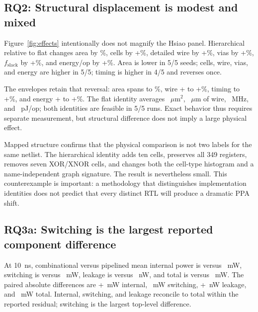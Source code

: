\documentclass[conference,10pt]{IEEEtran}
\begin{document}
\subsection{RQ2: Structural displacement is modest and mixed}

Figure~\ref{fig:effects} intentionally does not magnify the Hsiao panel. Hierarchical relative to flat changes area by \HsAreaMean\%, cells by +\HsCellsMean\%, detailed wire by +\HsWireMean\%, vias by +\HsViasMean\%, $f_{\mathrm{slack}}$ by +\HsFreqMean\%, and energy/op by +\HsEnergyMean\%. Area is lower in 5/5 seeds; cells, wire, vias, and energy are higher in 5/5; timing is higher in 4/5 and reverses once.

The envelopes retain that reversal: area spans \HsAreaMin{} to \HsAreaMax\%, wire +\HsWireMin{} to +\HsWireMax\%, timing \HsFreqMin{} to +\HsFreqMax\%, and energy +\HsEnergyMin{} to +\HsEnergyMax\%. The flat identity averages \HsiaoAreaAbs~$\mu$m$^2$, \HsiaoWireAbs~$\mu$m of wire, \HsiaoFreqAbs~MHz, and \HsiaoEnergyAbs~pJ/op; both identities are feasible in 5/5 runs. Exact behavior thus requires separate measurement, but structural difference does not imply a large physical effect.

Mapped structure confirms that the physical comparison is not two labels for the same netlist. The hierarchical identity adds ten cells, preserves all 349 registers, removes seven XOR/XNOR cells, and changes both the cell-type histogram and a name-independent graph signature. The result is nevertheless small. This counterexample is important: a methodology that distinguishes implementation identities does not predict that every distinct RTL will produce a dramatic PPA shift.



\subsection{RQ3a: Switching is the largest reported component difference}

At 10~ns, combinational versus pipelined mean internal power is \CombInternalMw{} versus \PipeInternalMw~mW, switching is \CombSwitchingMw{} versus \PipeSwitchingMw~mW, leakage is \CombLeakageNw{} versus \PipeLeakageNw~nW, and total is \CombTotalMw{} versus \PipeTotalMw~mW. The paired absolute differences are +\PowerInternalDeltaMw~mW internal, \PowerSwitchingDeltaMw~mW switching, +\PowerLeakageDeltaNw~nW leakage, and \PowerTotalDeltaMw~mW total. Internal, switching, and leakage reconcile to total within the reported residual; switching is the largest top-level difference.
\end{document}
